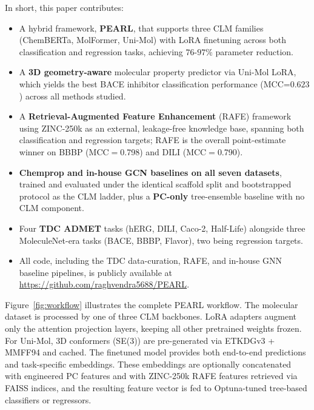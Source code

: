 \documentclass[final,1p,times]{elsarticle}
\begin{document}
In short, this paper contributes:
\begin{itemize}
  \item A hybrid framework, \textbf{PEARL}, that supports three CLM families (ChemBERTa, MolFormer, Uni-Mol) with LoRA finetuning across both classification and regression tasks, achieving $76$-$97\%$ parameter reduction.
  \item A \textbf{3D geometry-aware} molecular property predictor via Uni-Mol LoRA, which yields the best BACE inhibitor classification performance (MCC=$0.623$) across all methods studied.
  \item A \textbf{Retrieval-Augmented Feature Enhancement} (RAFE) framework using ZINC-250k as an external, leakage-free knowledge base, spanning both classification and regression targets; RAFE is the overall point-estimate winner on BBBP (MCC$=$0.798) and DILI (MCC$=$0.790).
  \item \textbf{Chemprop and in-house GCN baselines on all seven datasets}, trained and evaluated under the identical scaffold split and bootstrapped protocol as the CLM ladder, plus a \textbf{PC-only} tree-ensemble baseline with no CLM component.
  \item Four \textbf{TDC ADMET} tasks (hERG, DILI, Caco-2, Half-Life) alongside three MoleculeNet-era tasks (BACE, BBBP, Flavor), two being regression targets.
  \item All code, including the TDC data-curation, RAFE, and in-house GNN baseline pipelines, is publicly available at \url{https://github.com/raghvendra5688/PEARL}.
\end{itemize}

Figure~\ref{fig:workflow} illustrates the complete PEARL workflow. The molecular dataset is processed by one of three CLM backbones. LoRA adapters augment only the attention projection layers, keeping all other pretrained weights frozen. For Uni-Mol, 3D conformers (SE(3)) are pre-generated via ETKDGv3 + MMFF94 and cached.
The finetuned model provides both end-to-end predictions and task-specific embeddings. These embeddings are optionally concatenated with engineered PC features and with ZINC-250k RAFE features retrieved via FAISS indices, and the resulting feature vector is fed to Optuna-tuned tree-based classifiers or regressors.
\end{document}
